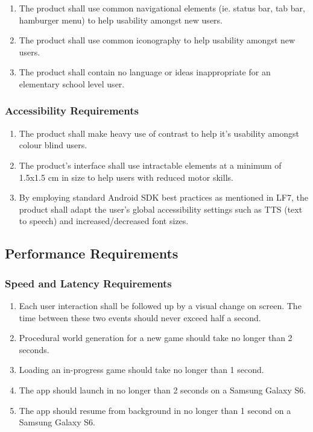\documentclass[]{article}
\begin{document}
\begin{enumerate}[{UH}1. ]
 	\resumeEnum
	\item The product shall use common navigational elements (ie. status bar, tab bar, hamburger menu) to help usability amongst new users.
	\item The product shall use common iconography to help usability amongst new users. 
	\item The product shall contain no language or ideas inappropriate for an elementary school level user.
	\holdEnum
\end{enumerate}

\subsubsection{Accessibility Requirements}
\label{ssub:accessibility_requirements}
\begin{enumerate}[{UH}1. ]
	\resumeEnum
	\item The product shall make heavy use of contrast to help it's usability amongst colour blind users.
	\item The product's interface shall use intractable elements at a minimum of 1.5x1.5 cm in size to help users with reduced motor skills.
	\item By employing standard Android SDK best practices as mentioned in LF7, the product shall adapt the user's global accessibility settings such as TTS (text to speech) and increased/decreased font sizes.
\end{enumerate}


\subsection{Performance Requirements}
\label{sub:performance_requirements}

\subsubsection{Speed and Latency Requirements}
\label{ssub:speed_and_latency_requirements}
\begin{enumerate}[{PR}1. ]
	\item Each user interaction shall be followed up by a visual change on screen. The time between these two events should never exceed half a second.
	\item Procedural world generation for a new game should take no longer than 2 seconds.
	\item Loading an in-progress game should take no longer than 1 second.
	\item The app should launch in no longer than 2 seconds on a Samsung Galaxy S6.
	\item The app should resume from background in no longer than 1 second on a Samsung Galaxy S6.
	\holdEnum
\end{enumerate}
\end{document}
